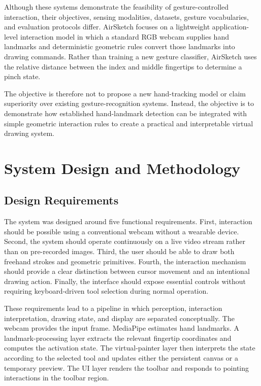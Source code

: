 \documentclass[conference]{IEEEtran}
\begin{document}
Although these systems demonstrate the feasibility of gesture-controlled interaction, their objectives, sensing modalities, datasets, gesture vocabularies, and evaluation protocols differ. AirSketch focuses on a lightweight application-level interaction model in which a standard RGB webcam supplies hand landmarks and deterministic geometric rules convert those landmarks into drawing commands. Rather than training a new gesture classifier, AirSketch uses the relative distance between the index and middle fingertips to determine a pinch state.

The objective is therefore not to propose a new hand-tracking model or claim superiority over existing gesture-recognition systems. Instead, the objective is to demonstrate how established hand-landmark detection can be integrated with simple geometric interaction rules to create a practical and interpretable virtual drawing system.

\section{System Design and Methodology}

\subsection{Design Requirements}
The system was designed around five functional requirements. First, interaction should be possible using a conventional webcam without a wearable device. Second, the system should operate continuously on a live video stream rather than on pre-recorded images. Third, the user should be able to draw both freehand strokes and geometric primitives. Fourth, the interaction mechanism should provide a clear distinction between cursor movement and an intentional drawing action. Finally, the interface should expose essential controls without requiring keyboard-driven tool selection during normal operation.

These requirements lead to a pipeline in which perception, interaction interpretation, drawing state, and display are separated conceptually. The webcam provides the input frame. MediaPipe estimates hand landmarks. A landmark-processing layer extracts the relevant fingertip coordinates and computes the activation state. The virtual-painter layer then interprets the state according to the selected tool and updates either the persistent canvas or a temporary preview. The UI layer renders the toolbar and responds to pointing interactions in the toolbar region.
\end{document}
